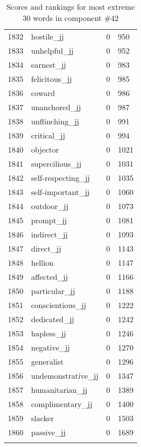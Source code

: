 \begin{longtable}[!htbp]{| rlr@{.}l |}
    1832 & hostile\_jj & 0 & 950 \\
    1833 & unhelpful\_jj & 0 & 952 \\
    1834 & earnest\_jj & 0 & 983 \\
    1835 & felicitous\_jj & 0 & 985 \\
    1836 & coward & 0 & 986 \\
    1837 & unanchored\_jj & 0 & 987 \\
    1838 & unflinching\_jj & 0 & 991 \\
    1839 & critical\_jj & 0 & 994 \\
    1840 & objector & 0 & 1021 \\
    1841 & supercilious\_jj & 0 & 1031 \\
    1842 & self-respecting\_jj & 0 & 1035 \\
    1843 & self-important\_jj & 0 & 1060 \\
    1844 & outdoor\_jj & 0 & 1073 \\
    1845 & prompt\_jj & 0 & 1081 \\
    1846 & indirect\_jj & 0 & 1093 \\
    1847 & direct\_jj & 0 & 1143 \\
    1848 & hellion & 0 & 1147 \\
    1849 & affected\_jj & 0 & 1166 \\
    1850 & particular\_jj & 0 & 1188 \\
    1851 & conscientious\_jj & 0 & 1222 \\
    1852 & dedicated\_jj & 0 & 1242 \\
    1853 & hapless\_jj & 0 & 1246 \\
    1854 & negative\_jj & 0 & 1270 \\
    1855 & generalist & 0 & 1296 \\
    1856 & undemonstrative\_jj & 0 & 1347 \\
    1857 & humanitarian\_jj & 0 & 1389 \\
    1858 & complimentary\_jj & 0 & 1400 \\
    1859 & slacker & 0 & 1503 \\
    1860 & passive\_jj & 0 & 1689 \\
    \hline
    \caption{Scores and rankings for most extreme 30 words in component \#42} \\
\end{longtable}
